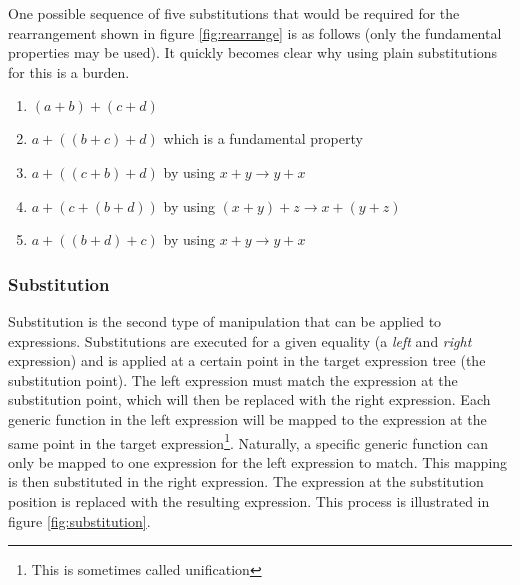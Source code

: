 \documentclass{article}
\begin{document}
\pagebreak
One possible sequence of five substitutions that would be required for the rearrangement shown in figure \ref{fig:rearrange} is as follows (only the fundamental properties may be used). It quickly becomes clear why using plain substitutions for this is a burden.
\begin{enumerate}
\item $(a+b)+(c+d)$
\item $a+((b+c)+d)$ which is a fundamental property
\item $a+((c+b)+d)$ by using $x+y\rightarrow y+x$
\item $a+(c+(b+d))$ by using $(x+y)+z\rightarrow x+(y+z)$
\item $a+((b+d)+c)$ by using $x+y\rightarrow y+x$
\end{enumerate}

\subsubsection{Substitution}
Substitution is the second type of manipulation that can be applied to expressions. Substitutions are executed for a given equality (a \emph{left} and \emph{right} expression) and is applied at a certain point in the target expression tree (the substitution point). The left expression must match the expression at the substitution point, which will then be replaced with the right expression. Each generic function in the left expression will be mapped to the expression at the same point in the target expression\footnote{This is sometimes called unification}. Naturally, a specific generic function can only be mapped to one expression for the left expression to match. This mapping is then substituted in the right expression. The expression at the substitution position is replaced with the resulting expression. This process is illustrated in figure \ref{fig:substitution}. 
\end{document}
